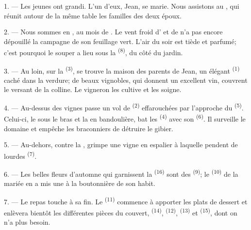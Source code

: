 \VUsaut{4.0mm}
\VUsaut{1.6mm}
\VUsaut{3.2mm}

\VUsaut{1.6mm}
\VUsaut{2.6mm}

\VUsaut{3.0mm}

1. --- Les jeunes ont grandi. L'un d'eux, Jean, se marie. Nous assistons au
, qui réunit autour de la même table les familles des
deux époux.

2. --- Nous sommes en , au mois de . Le vent
froid d' et de  n'a pas encore dépouillé la
campagne de son feuillage vert. L'air du soir est tiède et parfumé; c'est
pourquoi le souper a lieu sous la  \textsuperscript{(8)}, du
côté du jardin.

3. --- Au loin, sur la  \textsuperscript{(3)}, se trouve la
maison des parents de Jean, un élégant  \textsuperscript{(1)}
caché dans la verdure; de beaux vignobles, qui donnent un excellent vin,
couvrent le versant de la colline. Le vigneron les cultive et les soigne.

4. --- Au-dessus des vignes passe un vol de 
\textsuperscript{(2)} effarouchées par l'approche du 
\textsuperscript{(5)}. Celui-ci, le  sous le bras et la
 en bandoulière, bat les 
\textsuperscript{(4)} avec son  \textsuperscript{(6)}. Il
surveille le domaine et empêche les braconniers de détruire le gibier.

5. --- Au-dehors, contre la , grimpe une vigne en espalier à
laquelle pendent de lourdes  \textsuperscript{(7)}.

6. --- Les belles fleurs d'automne qui garnissent la 
\textsuperscript{(16)} sont des  \textsuperscript{(9)};
le  \textsuperscript{(10)} de la mariée en a mis une à la
boutonnière de son habit.

7. --- Le repas touche à sa fin. Le  \textsuperscript{(11)}
commence à apporter les plats de dessert et enlèvera bientôt les différentes
pièces du couvert,  \textsuperscript{(14)},
 \textsuperscript{(12)}, 
\textsuperscript{(13)} et  \textsuperscript{(15)}, dont on n'a
plus besoin.

